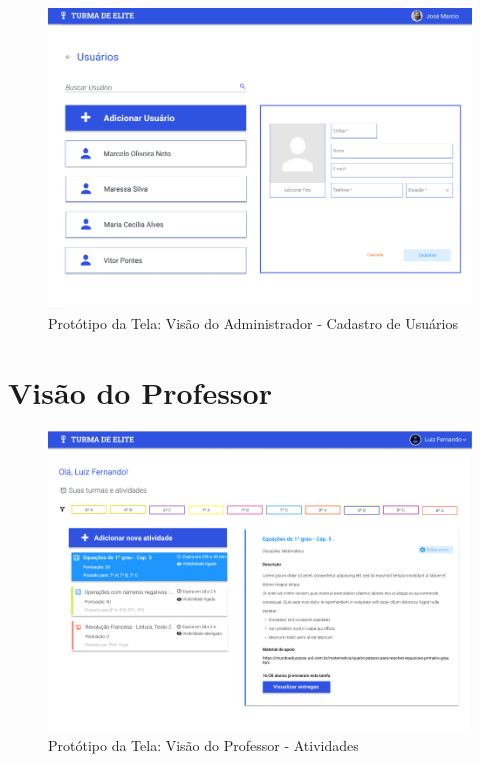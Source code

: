 \begin{apendicesenv}
\begin{figure}[htb]
    \centering
	\includegraphics[width=16cm]{imagens/Administrador-CadastroUsuario.png}
	\caption{\label{fig:cadastro-usuário} Protótipo da Tela: Visão do Administrador - Cadastro de Usuários}
\end{figure}
\FloatBarrier


\section{Visão do Professor}

\begin{figure}[htb]
    \centering
	\includegraphics[width=16cm]{imagens/Professor-Atividades.png}
	\caption{\label{fig:atividades} Protótipo da Tela: Visão do Professor - Atividades}
\end{figure}
\FloatBarrier


\end{apendicesenv}
